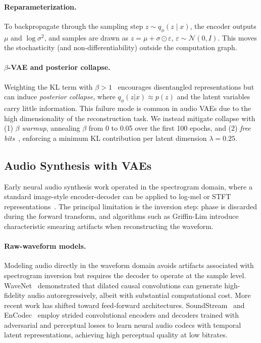 \documentclass[10pt, twocolumn]{article}
\begin{document}
\paragraph{Reparameterization.}
To backpropagate through the sampling step $z \sim q_\phi(z \mid x)$,
the encoder outputs $\mu$ and $\log \sigma^2$, and samples are drawn as
$z = \mu + \sigma \odot \varepsilon$, $\varepsilon \sim \mathcal{N}(0, I)$.
This moves the stochasticity (and non-differentiability) outside the computation graph.

\paragraph{$\beta$-VAE and posterior collapse.}
Weighting the KL term with $\beta>1$~\cite{higgins2017betavae} encourages disentangled representations
but can induce \textit{posterior collapse}, where $q_\phi(z|x)\approx p(z)$
and the latent variables carry little information.
This failure mode is common in audio VAEs due to the high dimensionality of the reconstruction task.
We instead mitigate collapse with (1) $\beta$ \textit{warmup}, annealing $\beta$ from 0 to 0.05 over the first 100 epochs,
and (2) \textit{free bits}~\cite{kingma2017improvingvariationalinferenceinverse}, enforcing a minimum KL contribution per latent dimension $\lambda=0.25$.

\subsection{Audio Synthesis with VAEs}

Early neural audio synthesis work operated in the spectrogram domain,
where a standard image-style encoder-decoder can be applied to
log-mel or STFT representations~\cite{natsiou2023interpretabletimbresynthesisusing}.
The principal limitation is the inversion step: phase is discarded during
the forward transform, and algorithms such as Griffin-Lim introduce
characteristic smearing artifacts when reconstructing the waveform.

\paragraph{Raw-waveform models.}
Modeling audio directly in the waveform domain avoids artifacts associated
with spectrogram inversion but requires the decoder to operate at the
sample level. WaveNet~\cite{oord2016wavenetgenerativemodelraw} demonstrated that dilated causal
convolutions can generate high-fidelity audio autoregressively, albeit
with substantial computational cost. More recent work has shifted toward
feed-forward architectures. SoundStream~\cite{zeghidour2021soundstreamendtoendneuralaudio} and
EnCodec~\cite{defossez2022highfidelityneuralaudio} employ strided convolutional encoders and
decoders trained with adversarial and perceptual losses to learn neural
audio codecs with temporal latent representations, achieving high
perceptual quality at low bitrates.
\end{document}
